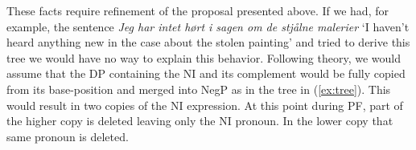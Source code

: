 \documentclass[12pt, letterpaper]{article}
\begin{document}
These facts require refinement of the proposal presented above. If we had, for example, the sentence \emph{Jeg har intet hørt i sagen om de stjålne malerier} `I haven't heard anything new in the case about the stolen painting' and tried to derive this tree we would have no way to explain this behavior. Following \citet{zeijlstraSyntacticallyComplexStatus2011} theory, we would assume that the DP containing the NI and its complement would be fully copied from its base-position and merged into NegP as in the tree in (\ref{ex:tree}). This would result in two copies of the NI expression. 
\ea	\label{ex:tree} 
\z 
At this point during PF, part of the higher copy is deleted leaving only the NI pronoun. In the lower copy that same pronoun is deleted. 
\ea \label{ex:tree-problem}
\end{document}
